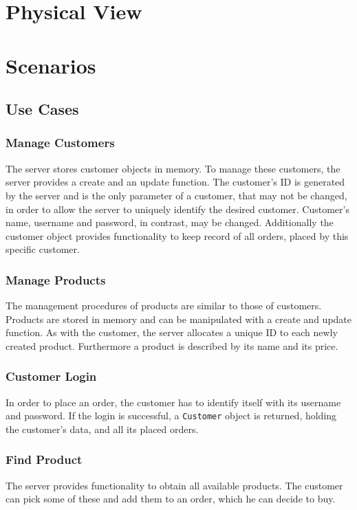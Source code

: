 \documentclass[a4paper]{article}
\begin{document}
\newpage


\section{Physical View}

\section{Scenarios}

\subsection{Use Cases}

\subsubsection{Manage Customers}
The server stores customer objects in memory. To manage these customers, the server provides a create and an update function. The customer's ID is generated by the server and is the only parameter of a customer, that may not be changed, in order to allow the server to uniquely identify the desired customer. Customer's name, username and password, in contrast, may be changed. Additionally the customer object provides functionality to keep record of all orders, placed by this specific customer.

\subsubsection{Manage Products}
The management procedures of products are similar to those of customers. Products are stored in memory and can be manipulated with a create and update function. As with the customer, the server allocates a unique ID to each newly created product. Furthermore a product is described by its name and its price.

\subsubsection{Customer Login}
In order to place an order, the customer has to identify itself with its username and password. If the login is successful, a \texttt{Customer} object is returned, holding the customer's data, and all its placed orders.

\subsubsection{Find Product}
The server provides functionality to obtain all available products. The customer can pick some of these and add them to an order, which he can decide to buy.
\end{document}
